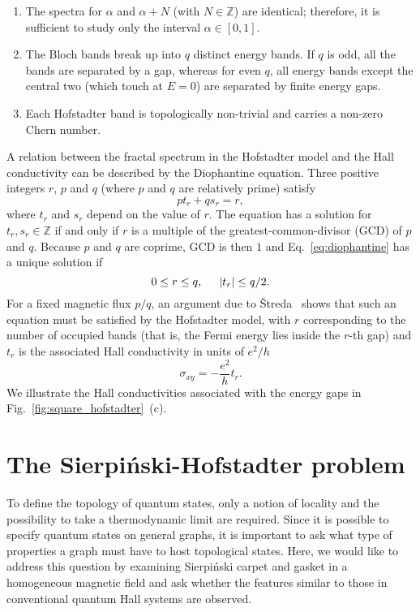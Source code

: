 \begin{enumerate}[label=\textbf{\arabic*.}]
\item The spectra for $\alpha$ and $\alpha + N$ (with $N \in \mathbb{Z}$) are identical; therefore, it is sufficient to study only the interval $\alpha  \in [0, 1]$.
\item The Bloch bands break up into $q$ distinct energy bands. If $q$ is odd, all the bands are separated by a gap, whereas for even $q$, all energy bands except the central two (which touch at $E = 0$) are separated by finite energy gaps.
\item Each Hofstadter band is topologically non-trivial and carries a non-zero Chern number.
\end{enumerate}

A relation between the fractal spectrum in the Hofstadter model and the Hall conductivity can be described by the Diophantine equation. Three positive integers $r$, $p$ and $q$ (where $p$ and $q$ are relatively prime) satisfy
\begin{equation}
p t_r + q s_r = r,
\label{eq:diophantine}
\end{equation}
where $t_r$ and $s_r$ depend on the value of $r$. The equation has a solution for $t_r, s_r \in \mathbb{Z}$ if and only if $r$ is a multiple of the greatest-common-divisor (GCD) of $p$ and $q$. Because $p$ and $q$ are coprime, GCD is then $1$ and Eq.~\eqref{eq:diophantine} has a unique solution if
\begin{equation}
0 \leq r \leq q, \hspace*{0.5cm} |t_r| \leq q / 2.
\end{equation}
For a fixed magnetic flux $p/q$, an argument due to \v{S}treda~\cite{Streda_1982} shows that such an equation must be satisfied by the Hofstadter model, with $r$ corresponding to the number of occupied bands (that is, the Fermi energy lies inside the $r$-th gap) and $t_r$ is the associated Hall conductivity in units of $e^2/h$
\begin{equation}
\sigma_{xy} = - \frac{e^2}{h} t_r.
\end{equation}
We illustrate the Hall conductivities associated with the energy gaps in Fig.~\ref{fig:square_hofstadter}~(c).

\section{The Sierpiński-Hofstadter problem}
\label{sec:sierp-hof}
To define the topology of quantum states, only a notion of locality and the possibility to take a thermodynamic limit are required. Since it is possible to specify quantum states on general graphs, it is important to ask what type of properties a graph must have to host topological states. Here, we would like to address this question by examining Sierpiński carpet and gasket in a homogeneous magnetic field and ask whether the features similar to those in conventional quantum Hall systems are observed. 

